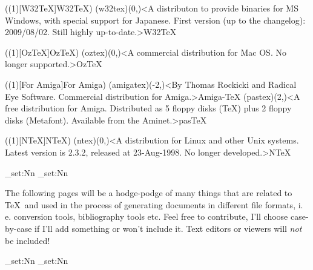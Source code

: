 \tograph(\tostruct(1)[W32\TeX]{W32\TeX}){
	\tonode(w32tex)(0,\layer)<A distributon to provide binaries for MS Windows, with special support for Japanese. First version (up to the changelog): 2009/08/02. Still highly up-to-date.>{W32\TeX}
}

\tograph(\tostruct(1)[OzTeX]{OzTeX}){
	\tonode[\histdistro](oztex)(0,\layer)<A commercial distribution for Mac OS. No longer supported.>{Oz\TeX}
}

\tograph(\tostruct(1)[For Amiga]{For Amiga}){
	\tonode[\histdistro](amigatex)(-2,\layer)<By Thomas Rockicki and Radical Eye Software. Commercial distribution for Amiga.>{Amiga-TeX}
	\tonode[\histdistro](pastex)(2,\layer)<A free distribution for Amiga. Distributed as 5 floppy disks (TeX) plus 2 floppy disks (Metafont). Available from the Aminet.>{pasTeX}
}

\tograph(\tostruct(1)[N\TeX]{N\TeX}){
	\tonode[\histdistro](ntex)(0,\layer)<A distribution for Linux and other Unix systems. Latest version is 2.3.2, released at 23-Aug-1998. No longer developed.>{N\TeX}
}

\ExplSyntaxOn
  \dim_set:Nn\pdfpagewidth{13cm}       %
  \dim_set:Nn\pdfpageheight{6cm}
\ExplSyntaxOff
\newpage
{}
\parbox{\textwidth}{\normalsize
The following pages will be a hodge-podge of many things that are related to \TeX\ and used in the process of generating documents in different file formats, i.\,e. conversion tools, bibliography tools etc. Feel free to contribute, I'll choose case-by-case if I'll add something or won't include it. Text editors or viewers will \emph{not} be included!
}
  \restoregeometry
\ExplSyntaxOn
  \dim_set:Nn\pdfpagewidth{21cm}     %
  \dim_set:Nn\pdfpageheight{29.7cm}
\ExplSyntaxOff

